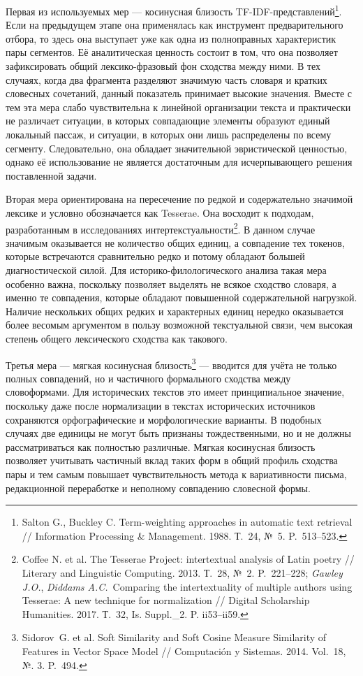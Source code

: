 Первая из используемых мер --- косинусная близость TF-IDF-представлений\footnote{Salton G., Buckley C. Term-weighting approaches in automatic text retrieval // Information Processing \& Management. 1988. Т.~24, №~5. P.~513--523.}. Если на предыдущем этапе она применялась как инструмент предварительного отбора, то здесь она выступает уже как одна из полноправных характеристик пары сегментов. Её аналитическая ценность состоит в том, что она позволяет зафиксировать общий лексико-фразовый фон сходства между ними. В тех случаях, когда два фрагмента разделяют значимую часть словаря и кратких словесных сочетаний, данный показатель принимает высокие значения. Вместе с тем эта мера слабо чувствительна к линейной организации текста и практически не различает ситуации, в которых совпадающие элементы образуют единый локальный пассаж, и ситуации, в которых они лишь распределены по всему сегменту. Следовательно, она обладает значительной эвристической ценностью, однако её использование не является достаточным для исчерпывающего решения поставленной задачи.

Вторая мера ориентирована на пересечение по редкой и содержательно значимой лексике и условно обозначается как Tesserae. Она восходит к подходам, разработанным в исследованиях интертекстуальности\footnote{Coffee N. et al. The Tesserae Project: intertextual analysis of Latin poetry // Literary and Linguistic Computing. 2013. Т.~28, №~2. P.~221--228; \emph{Gawley J.O.}, \emph{Diddams A.C.}~Comparing the intertextuality of multiple authors using Tesserae: A new technique for normalization // Digital Scholarship Humanities. 2017. Т.~32, Is. Suppl.\_2. P. ii53--ii59.}. В данном случае значимым оказывается не количество общих единиц, а совпадение тех токенов, которые встречаются сравнительно редко и потому обладают большей диагностической силой. Для историко-филологического анализа такая мера особенно важна, поскольку позволяет выделять не всякое сходство словаря, а именно те совпадения, которые обладают повышенной содержательной нагрузкой. Наличие нескольких общих редких и характерных единиц нередко оказывается более весомым аргументом в пользу возможной текстуальной связи, чем высокая степень общего лексического сходства как такового.

Третья мера --- мягкая косинусная близость\footnote{Sidorov~G. et al. Soft Similarity and Soft Cosine Measure Similarity of Features in Vector Space Model // Computación y Sistemas. 2014. Vol.~18, №. 3. P.~494.} --- вводится для учёта не только полных совпадений, но и частичного формального сходства между словоформами. Для исторических текстов это имеет принципиальное значение, поскольку даже после нормализации в текстах исторических источников сохраняются орфографические и морфологические варианты. В подобных случаях две единицы не могут быть признаны тождественными, но и не должны рассматриваться как полностью различные. Мягкая косинусная близость позволяет учитывать частичный вклад таких форм в общий профиль сходства пары и тем самым повышает чувствительность метода к вариативности письма, редакционной переработке и неполному совпадению словесной формы.

